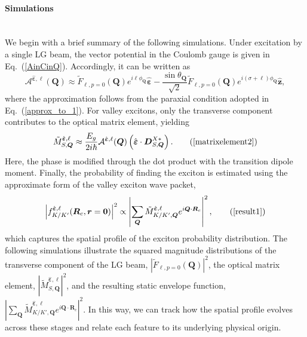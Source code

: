 \paragraph*{Simulations}~\\
We begin with a brief summary of the following simulations. Under excitation by a single LG beam, the vector potential in the Coulomb gauge is given in Eq.~(\ref{AinCinQ}). Accordingly, it can be written as
\begin{equation}
\mathcal{A}^{\hat{\boldsymbol{\varepsilon}},\ell}(\boldsymbol{Q})
\approx
\tilde{F}_{\ell, p=0}(\boldsymbol{Q})
e^{i\ell \phi_{\boldsymbol{Q}}}
\hat{\boldsymbol{\varepsilon}}
-
\frac{\sin\theta_{\boldsymbol{Q}}}{\sqrt{2}}
\tilde{F}_{\ell, p=0}(\boldsymbol{Q})
e^{i(\sigma+\ell)\phi_{\boldsymbol{Q}}}
\hat{\boldsymbol{z}},
\end{equation}
where the approximation follows from the paraxial condition adopted in Eq.~(\ref{approx_to_1}). For valley excitons, only the transverse component contributes to the optical matrix element, yielding
\begin{equation} 
\tilde{M}^{\hat{\boldsymbol{\varepsilon}}, \ell}_{S,\boldsymbol{Q}}
\approx
\frac{E_g}{2i\hslash}
\mathcal{A}^{\hat{\boldsymbol{\varepsilon}},\ell}(\boldsymbol{Q})
\left(
\hat{\boldsymbol{\varepsilon}}
\cdot
\boldsymbol{D}^{X*}_{S,\boldsymbol{Q}}
\right).
\tag{\ref{matrixelement2}}
\end{equation}
Here, the phase is modified through the dot product with the transition dipole moment. Finally, the probability of finding the exciton is estimated using the approximate form of the valley exciton wave packet,
\begin{equation}
\left| f_{K/K'}^{\hat{\boldsymbol{\varepsilon}}, \ell}(\boldsymbol{R}_c, \boldsymbol{r}=\boldsymbol{0}) \right|^2
\propto
\left|
\sum_{\boldsymbol{Q}}
\tilde{M}^{\hat{\boldsymbol{\varepsilon}}, \ell}_{K/K',\boldsymbol{Q}}
e^{i\boldsymbol{Q}\cdot\boldsymbol{R}_c}
\right|^2,
\tag{\ref{result1}}
\end{equation}
which captures the spatial profile of the exciton probability distribution. 
The following simulations illustrate the squared magnitude distributions of the 
transverse component of the LG beam, $\left|\tilde{F}_{\ell, \allowbreak p=0}(\boldsymbol{Q})\right|^2$, 
the optical matrix element, $\left|\tilde{M}^{\hat{\boldsymbol{\varepsilon}}, \ell}_{S,\boldsymbol{Q}}\right|^2$, 
and the resulting static envelope function, 
$\left|
\sum_{\boldsymbol{Q}}
\tilde{M}^{\hat{\boldsymbol{\varepsilon}}, \ell}_{K/K',\boldsymbol{Q}}
e^{i\boldsymbol{Q}\cdot\boldsymbol{R}_c}
\right|^2$. 
In this way, we can track how the spatial profile evolves across these stages 
and relate each feature to its underlying physical origin.

